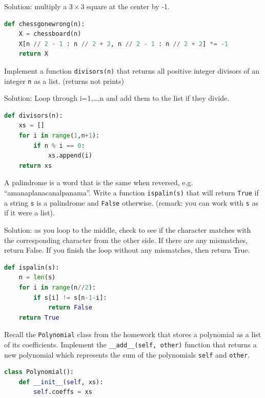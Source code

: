 \documentclass[addpoints,12pt]{exam}
\newcommand{\code}[1]{{\texttt{#1}}}
\begin{document}
\begin{questions}
\vspace{0.2in}
Solution: multiply a $3\times3$ square at the center by -1.
\begin{lstlisting}[language=python]
def chessgonewrong(n):
    X = chessboard(n)
    X[n // 2 - 1 : n // 2 + 2, n // 2 - 1 : n // 2 + 2] *= -1
    return X
\end{lstlisting}
\vfill


\vfill


\newpage
\question[20] Implement a function \code{divisors(n)} that returns all positive integer divisors of an integer \code{n} as a list. (returns not prints)


\vspace{0.8in}

Solution: Loop through i=1,\dots,n and add them to the list if they divide. 
\begin{lstlisting}[language=python]
def divisors(n):
    xs = []
    for i in range(1,n+1):
        if n % i == 0:
            xs.append(i)
    return xs
\end{lstlisting}


\newpage
\question[20] A palindrome is a word that is the same when reversed, e.g. ``amanaplanacanalpanama''. Write a function \code{ispalin(s)} that will return \code{True} if a string \code{s} is a palindrome and \code{False} otherwise. (remark: you can work with \code{s} as if it were a list). 

\vspace{0.8in}
Solution: as you loop to the middle, check to see if the character matches with the corresponding character from the other side. If there are any mismatches, return False. If you finish the loop without any mismatches, then return True. 
\vspace{0.2in}

\begin{lstlisting}[language=python]
def ispalin(s):
    n = len(s)
    for i in range(n//2):
        if s[i] != s[n-1-i]:
            return False
    return True
\end{lstlisting}

\newpage
\question[20] Recall the \code{Polynomial} class from the homework that stores a polynomial as a list of its coefficients. Implement the \code{\_\_add\_\_(self, other)} function that returns a new polynomial which represents the sum of the polynomials \code{self} and \code{other}.  

\begin{lstlisting}[language=python]
class Polynomial():
    def __init__(self, xs):
        self.coeffs = xs
   

\end{lstlisting}
\end{questions}
\end{document}
